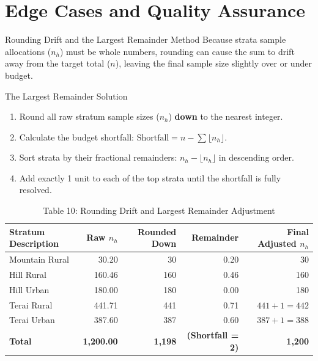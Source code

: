 \documentclass[10pt, aspectratio=169]{beamer}
\begin{document}
  \section{Edge Cases and Quality Assurance}
  
  \begin{frame}{Rounding Drift and the Largest Remainder Method}
      Because strata sample allocations ($n_h$) must be whole numbers, rounding can cause the sum to drift away from the target total ($n$), leaving the final sample size slightly over or under budget.
      
      \begin{block}{The Largest Remainder Solution}
          \begin{enumerate}
              \item Round all raw stratum sample sizes ($n_h$) \textbf{down} to the nearest integer.
              \item Calculate the budget shortfall: $\text{Shortfall} = n - \sum \lfloor n_h \rfloor$.
              \item Sort strata by their fractional remainders: $n_h - \lfloor n_h \rfloor$ in descending order.
              \item Add exactly 1 unit to each of the top strata until the shortfall is fully resolved.
          \end{enumerate}
      \end{block}
      
      \begin{table}
          \caption{Table 10: Rounding Drift and Largest Remainder Adjustment}
          \tiny
          \begin{tabularx}{0.8\textwidth}{lrrrr}
              \toprule
              \textbf{Stratum Description} & \textbf{Raw $n_h$} & \textbf{Rounded Down} & \textbf{Remainder} & \textbf{Final Adjusted $n_h$} \\
              \midrule
              Mountain Rural & 30.20 & 30 & 0.20 & 30 \\
              Hill Rural & 160.46 & 160 & 0.46 & 160 \\
              Hill Urban & 180.00 & 180 & 0.00 & 180 \\
              Terai Rural & 441.71 & 441 & 0.71 & \cellcolor{green!15}$441+1 = 442$ \\
              Terai Urban & 387.60 & 387 & 0.60 & \cellcolor{green!15}$387+1 = 388$ \\
              \midrule
              \textbf{Total} & \textbf{1,200.00} & \textbf{1,198} & \textbf{(Shortfall = 2)} & \textbf{1,200} \\
              \bottomrule
          \end{tabularx}
      \end{table}
  \end{frame}
  
\end{document}
